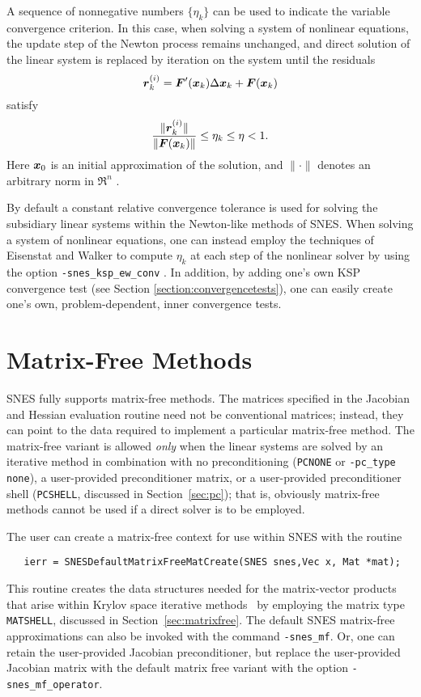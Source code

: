 A sequence of nonnegative numbers $ \{\eta_k\} $ can be used to 
indicate the variable convergence criterion.
In this case, when solving a system of nonlinear equations, the 
update step of the Newton process remains unchanged, and direct 
solution of the linear system is replaced by iteration on the 
system until the residuals
\[  \mbox{\boldmath \(r\)}_k^{(i)} =  \mbox{\boldmath \(F\)}'(\mbox{\boldmath \(x\)}_k) \Delta \mbox{\boldmath \(x\)}_k + \mbox{\boldmath \(F\)}(\mbox{\boldmath \(x\)}_k) \]
satisfy
\[  \frac{ \| \mbox{\boldmath \(r\)}_k^{(i)} \| }{ \| \mbox{\boldmath \(F\)}(\mbox{\boldmath \(x\)}_k) \| } \leq \eta_k \leq \eta < 1. \]
Here $ \mbox{\boldmath \(x\)}_0 $ is an initial approximation of the solution, and
$ \| \cdot \| $ denotes an arbitrary norm in $ \Re^n $ .  

By default a constant relative convergence tolerance is used for
solving the subsidiary linear systems within the Newton-like methods
of SNES.  When solving a system of nonlinear equations, one can
instead employ the techniques of Eisenstat and Walker \cite{ew94}
to compute $ \eta_k $ at each step of the nonlinear solver by using the
option {\tt -snes\_ksp\_ew\_conv} . In addition,
by adding one's own KSP convergence test (see Section 
\ref{section:convergencetests}), one can easily create one's own,
problem-dependent, inner convergence tests. 

\section{Matrix-Free Methods}
\label{sec:nlmatrixfree}

SNES fully supports matrix-free methods. The matrices specified in the
Jacobian and Hessian evaluation routine need not be conventional
matrices; instead, they can point to the data required to implement a
particular matrix-free method.  The matrix-free variant is allowed
{\em only} when the linear systems are solved by an iterative method
in combination with no preconditioning ({\tt PCNONE} or {\tt -pc\_type none}),
a user-provided preconditioner matrix, or a user-provided preconditioner
shell ({\tt PCSHELL}, discussed in Section~\ref{sec:pc}); that is,
obviously matrix-free methods cannot be used if a direct solver is to 
be employed.  

The user can create a matrix-free context for use within SNES with 
the routine
\begin{verbatim}
   ierr = SNESDefaultMatrixFreeMatCreate(SNES snes,Vec x, Mat *mat);
\end{verbatim}
This routine creates the data structures needed for the matrix-vector 
products that arise within Krylov space iterative methods~\cite{brownsaad:90}
by employing the matrix type {\tt MATSHELL}, 
discussed in Section~\ref{sec:matrixfree}.  The default SNES matrix-free
approximations can also be invoked with the command {\tt -snes\_mf}. 
Or, one can retain the user-provided Jacobian preconditioner, but replace the 
user-provided Jacobian matrix with the default matrix free variant with the
option {\tt -snes\_mf\_operator}. 

